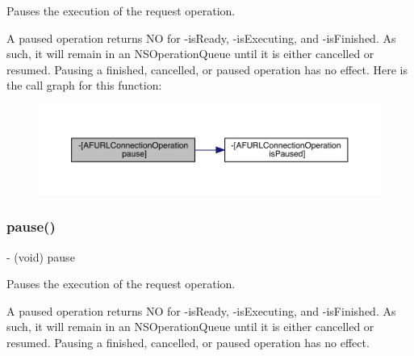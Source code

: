 Pauses the execution of the request operation.

A paused operation returns {\ttfamily NO} for {\ttfamily -\/is\+Ready}, {\ttfamily -\/is\+Executing}, and {\ttfamily -\/is\+Finished}. As such, it will remain in an {\ttfamily N\+S\+Operation\+Queue} until it is either cancelled or resumed. Pausing a finished, cancelled, or paused operation has no effect. Here is the call graph for this function\+:\nopagebreak
\begin{figure}[H]
\begin{center}
\leavevmode
\includegraphics[width=350pt]{interface_a_f_u_r_l_connection_operation_a7f895d00bdf837f67b959a3bf1bc37a2_cgraph}
\end{center}
\end{figure}
\mbox{\label{interface_a_f_u_r_l_connection_operation_a7f895d00bdf837f67b959a3bf1bc37a2}} 
\subsubsection{\texorpdfstring{pause()}{pause()}\hspace{0.1cm}{\footnotesize\ttfamily [3/3]}}
{\footnotesize\ttfamily -\/ (void) pause \begin{DoxyParamCaption}{ }\end{DoxyParamCaption}}

Pauses the execution of the request operation.

A paused operation returns {\ttfamily NO} for {\ttfamily -\/is\+Ready}, {\ttfamily -\/is\+Executing}, and {\ttfamily -\/is\+Finished}. As such, it will remain in an {\ttfamily N\+S\+Operation\+Queue} until it is either cancelled or resumed. Pausing a finished, cancelled, or paused operation has no effect. \mbox{\label{interface_a_f_u_r_l_connection_operation_ae67c1478ba17af4426ca7152251da473}} 
